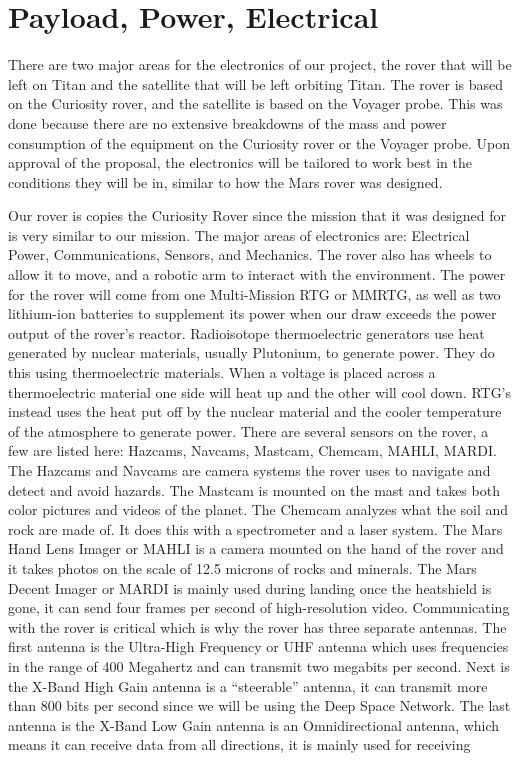 \documentclass[conf]{new-aiaa}
\begin{document}
{\section{Payload, Power, Electrical}
\par There are two major areas for the electronics of our project, the rover that will be left on Titan and the satellite that will be left orbiting Titan. The rover is based on the Curiosity rover, and the satellite is based on the Voyager probe. This was done because there are no extensive breakdowns of the mass and power consumption of the equipment on the Curiosity rover or the Voyager probe. Upon approval of the proposal, the electronics will be tailored to work best in the conditions they will be in, similar to how the Mars rover was designed.\\
\par Our rover is copies the Curiosity Rover since the mission that it was designed for is very similar to our mission. The major areas of electronics are: Electrical Power, Communications, Sensors, and Mechanics. The rover also has wheels to allow it to move, and a robotic arm to interact with the environment. The power for the rover will come from one Multi-Mission RTG or MMRTG, as well as two lithium-ion batteries to supplement its power when our draw exceeds the power output of the rover’s reactor\cite{NASA-Power}. Radioisotope thermoelectric generators use heat generated by nuclear materials, usually Plutonium, to generate power. They do this using thermoelectric materials. When a voltage is placed across a thermoelectric material one side will heat up and the other will cool down. RTG’s instead uses the heat put off by the nuclear material and the cooler temperature of the atmosphere to generate power\cite{NASA-Resources}.  There are several sensors on the rover, a few are listed here: Hazcams, Navcams, Mastcam, Chemcam, MAHLI, MARDI\cite{NASA-Resources}. The Hazcams and Navcams are camera systems the rover uses to navigate and detect and avoid hazards\cite{NASA-Cameras}. The Mastcam is mounted on the mast and takes both color pictures and videos of the planet\cite{NASA-Cameras}. The Chemcam analyzes what the soil and rock are made of. It does this with a spectrometer and a laser system\cite{NASA-Cameras}. The Mars Hand Lens Imager or MAHLI is a camera mounted on the hand of the rover and it takes photos on the scale of 12.5 microns of rocks and minerals\cite{NASA-Cameras}. The Mars Decent Imager or MARDI is mainly used during landing once the heatshield is gone, it can send four frames per second of high-resolution video\cite{NASA-Cameras}. Communicating with the rover is critical which is why the rover has three separate antennas\cite{NASA-Communications}. The first antenna is the Ultra-High Frequency or UHF antenna which uses frequencies in the range of 400 Megahertz and can transmit two megabits per second\cite{NASA-Communications}. Next is the X-Band High Gain antenna is a “steerable” antenna, it can transmit more than 800 bits per second since we will be using the Deep Space Network\cite{NASA-Communications}. The last antenna is the X-Band Low Gain antenna is an Omnidirectional antenna, which means it can receive data from all directions, it is mainly used for receiving }
\end{document}

